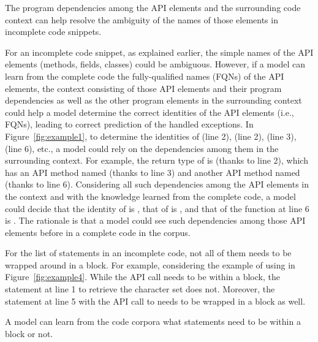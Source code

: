 \begin{Observation} 
The program dependencies among the API elements and the surrounding
code context can help resolve the ambiguity of the names of those
elements in incomplete code snippets.
\end{Observation}

For an incomplete code snippet, as explained earlier, the simple names
of the API elements (methods, fields, classes) could be ambiguous.
However, if a model can learn from the complete code the
fully-qualified names (FQNs) of the API elements, the context
consisting of those API elements and their program dependencies as
well as the other program elements in the surrounding context could
help a model determine the correct identities of the API elements
(i.e., FQNs), leading to correct prediction of the handled exceptions.
%
In Figure~\ref{fig:example1}, to determine the identities of
 (line 2),  (line 2),
 (line 3),  (line 6), etc., a model
could rely on the dependencies among them in the surrounding context.
For example, the return type of  is
 (thanks to line 2), which has an API method named
 (thanks to line 3) and another API method named
 (thanks to line 6). Considering all such dependencies among
the API elements in the context and with the knowledge learned from
the complete code, a model could decide that the identity of
 is , that of
 is
, and that of the
 function at line 6 is
. The rationale is that a
model could see such dependencies among those API elements before in
a complete code in the corpus.



For the list of statements in an incomplete code, not all of them
needs to be wrapped around in a  block. For example,
considering the example of using  in
Figure~\ref{fig:example4}. While the API call
 needs to be within a
 block, the statement at line 1 to retrieve the
character set does not. Moreover, the statement at line 5 with the API
call to  needs to be wrapped in a 
block as well.



\begin{Observation} 
  A model can learn from the code corpora what statements need to be
  within a  block or not.
\end{Observation}
